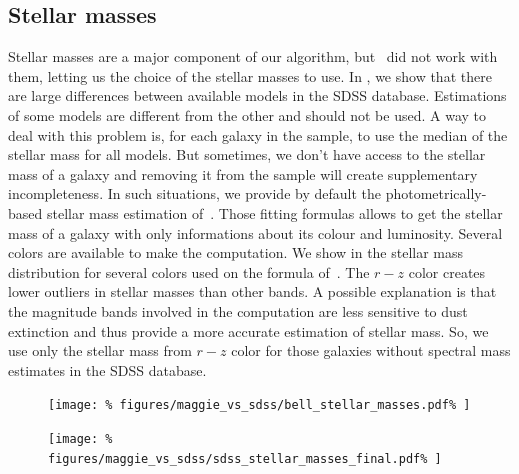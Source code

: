 \subsection{Stellar masses}
\label{sub:stellar_masses}

Stellar masses are a major component of our algorithm, but~\cite{Tempel+14} did
not work with them, letting us the choice of the stellar masses to use. In
, we show that there are large differences
between available models in the SDSS database. Estimations of some models are
different from the other and should not be used. A way to deal with this
problem is, for each galaxy in the sample, to use the median of the stellar
mass for all models. But sometimes, we don't have access to the stellar mass of
a galaxy and removing it from the sample will create supplementary
incompleteness. In such situations, we provide by default the
photometrically-based stellar mass estimation  of~\cite{Bell+03}. Those fitting
formulas allows to get the stellar mass of a galaxy with only informations
about its colour and luminosity. Several colors are available to make the
computation. We show in  the stellar mass
distribution for several colors used on the formula of~\cite{Bell+03}. The
$r-z$ color creates lower outliers in stellar masses than other bands. A
possible explanation is that the magnitude bands involved in the computation
are less sensitive to dust extinction and thus provide a more accurate
estimation of stellar mass. So, we use only the stellar mass from $r-z$ color
for those galaxies without spectral mass estimates in the SDSS database.

\begin{figure}[htb]
    \centering
    \begin{minipage}{0.49\linewidth}
        \centering
        \texttt{[image: \%
            figures/maggie\_vs\_sdss/bell\_stellar\_masses.pdf\%
        ]}
    \end{minipage}
    \begin{minipage}{0.49\linewidth}
        \centering
        \texttt{[image: \%
            figures/maggie\_vs\_sdss/sdss\_stellar\_masses\_final.pdf\%
        ]}
    \end{minipage}
\end{figure}

